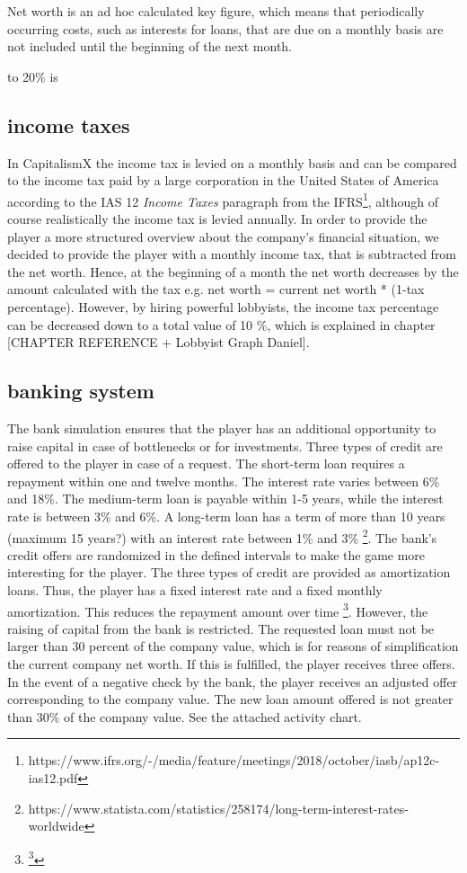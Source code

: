 Net worth is an ad hoc calculated key figure, which means that periodically occurring costs, such as interests for loans, that are due on a monthly basis are not included until the beginning of the next month. 

 to 20\% is
 
\subsection{income taxes}
In CapitalismX the income tax is levied on a monthly basis and can be compared to the income tax paid by a large corporation in the United States of America according to the IAS 12 \textit{Income Taxes} paragraph from the IFRS\footnote{https://www.ifrs.org/-/media/feature/meetings/2018/october/iasb/ap12c-ias12.pdf}, although of course realistically the income tax is levied annually. In order to provide the player a more structured overview about the company’s financial situation, we decided to provide the player with a monthly income tax, that is subtracted from the net worth. Hence, at the beginning of a month the net worth decreases by the amount calculated with the tax e.g. net worth = current net worth * (1-tax percentage). However, by hiring powerful lobbyists, the income tax percentage can be decreased down to a total value of 10 \%, which is explained in chapter [CHAPTER REFERENCE + Lobbyist Graph Daniel].


\subsection{banking system}
The bank simulation ensures that the player has an additional opportunity to raise capital in case of bottlenecks or for investments. Three types of credit are offered to the player in case of a request. 
The short-term loan requires a repayment within one and twelve months. The interest rate varies between 6\% and 18\%. The medium-term loan is payable within 1-5 years, while the interest rate is between 3\% and 6\%. A long-term loan has a term of more than 10 years (maximum 15 years?) with an interest rate between 1\% and 3\% \footnote{https://www.statista.com/statistics/258174/long-term-interest-rates-worldwide}. The bank's credit offers are randomized in the defined intervals to make the game more interesting for the player. The three types of credit are provided as amortization loans. Thus, the player has a fixed interest rate and a fixed monthly amortization. This reduces the repayment amount over time \footnote{\footnote{https://www.investopedia.com/terms/a/amortized\_loan.asp}}.
However, the raising of capital from the bank is restricted.
The requested loan must not be larger than 30 percent of the company value, which is for reasons of simplification the current company net worth. If this is fulfilled, the player receives three offers. In the event of a negative check by the bank, the player receives an adjusted offer corresponding to the company value. The new loan amount offered is not greater than 30\% of the company value. See the attached activity chart. 

